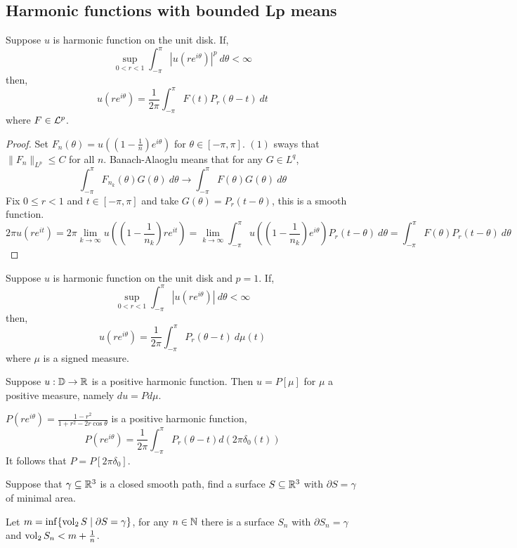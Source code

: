 \subsection{Harmonic functions with bounded Lp means}
\begin{theorem}
	Suppose $u$ is harmonic function on the unit disk.
	If,
	\[
		\sup_{0 < r < 1} \int_{-\pi}^{\pi} {|u(r e^{i \theta})|}^p\ d \theta < \infty
		\tag{1}
	\]
	then,
	\[
		u(r e^{i \theta})
		= \frac{1}{2 \pi} \int_{-\pi}^{\pi} F(t) P_r(\theta - t)\ dt
	\]
	where $F \in \mathcal{L}^p$.
\end{theorem}
\begin{proof}
	Set $F_n(\theta) = u((1 - \frac{1}{n}) e^{i \theta})$ for $\theta \in [-\pi, \pi]$.
	$(1)$ sways that $\lVert F_n \rVert_{L^p} \le C$ for all $n$.
	Banach-Alaoglu means that for any $G \in L^q$,
	\[
		\int_{-\pi}^{\pi} F_{n_k}(\theta) G(\theta)\ d \theta
		\to \int_{-\pi}^{\pi} F(\theta) G(\theta)\ d \theta
	\]
	Fix $0 \le r < 1$ and $t \in [-\pi, \pi]$ and take $G(\theta) = P_r(t - \theta)$, this is a smooth function.
	\[
		2 \pi u(r e^{i t})
		= 2 \pi \lim_{k \to \infty} u((1 - \frac{1}{n_k}) r e^{i t})
		= \lim_{k \to \infty} \int_{-\pi}^{\pi} u((1 - \frac{1}{n_k}) e^{i \theta}) P_r(t - \theta)\ d \theta
		= \int_{-\pi}^{\pi} F(\theta) P_r(t - \theta)\ d \theta
	\]
\end{proof}
\begin{theorem}
	Suppose $u$ is harmonic function on the unit disk and $p = 1$.
	If,
	\[
		\sup_{0 < r < 1} \int_{-\pi}^{\pi} {|u(r e^{i \theta})|}\ d \theta < \infty
	\]
	then,
	\[
		u(r e^{i \theta})
		= \frac{1}{2 \pi} \int_{-\pi}^{\pi} P_r(\theta - t)\ d \mu(t)
	\]
	where $\mu$ is a signed measure.
\end{theorem}
\begin{corollary}
	Suppose $u : \mathbb{D} \to \mathbb{R}$ is a positive harmonic function.
	Then $u = P[\mu]$ for $\mu$ a positive measure, namely $d u = P d \mu$.
\end{corollary}
\begin{example}
	$P(r e^{i \theta}) = \frac{1 - r^2}{1 + r^2 - 2 r \cos \theta}$ is a positive harmonic function,
	\[
		P(r e^{i \theta})
		= \frac{1}{2 \pi} \int_{-\pi}^{\pi} P_r(\theta - t) d (2 \pi \delta_0(t))
	\]
	It follows that $P = P[2 \pi \delta_0]$.
\end{example}
\begin{example}
	Suppose that $\gamma \subseteq \mathbb{R}^3$ is a closed smooth path,
	find a surface $S \subseteq \mathbb{R}^3$ with $\partial S = \gamma$ of minimal area.

	Let $m = \inf\{ \operatorname{vol}_2 S \mid \partial S = \gamma \}$, for any $n \in \mathbb{N}$ there is a surface $S_n$ with $\partial S_n = \gamma$ and $\operatorname{vol}_2 S_n < m + \frac{1}{n}$.
\end{example}
